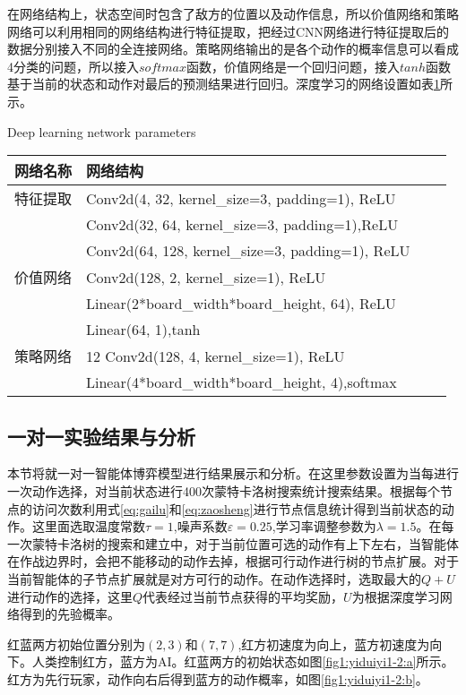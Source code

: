 在网络结构上，状态空间时包含了敌方的位置以及动作信息，所以价值网络和策略网络可以利用相同的网络结构进行特征提取，把经过CNN网络进行特征提取后的数据分别接入不同的全连接网络。策略网络输出的是各个动作的概率信息可以看成4分类的问题，所以接入$softmax$函数，价值网络是一个回归问题，接入$tanh$函数基于当前的状态和动作对最后的预测结果进行回归。深度学习的网络设置如表\ref{tab4}所示。

\begin{table}[htbp]
	\centering
	{ Deep learning network parameters }
	\label{tab4}
	\begin{tabular}{llll} \toprule
		网络名称   & 网络结构  \\  \midrule
		特征提取 &	Conv2d(4, 32, kernel\_size=3, padding=1), ReLU\\
		&	Conv2d(32, 64, kernel\_size=3, padding=1),ReLU\\
		&	Conv2d(64, 128, kernel\_size=3, padding=1), ReLU\\
		价值网络&Conv2d(128, 2, kernel\_size=1), ReLU\\
		&Linear(2*board\_width*board\_height, 64), ReLU\\
		&Linear(64, 1),tanh\\
		策略网络&12 Conv2d(128, 4, kernel\_size=1), ReLU\\
		&Linear(4*board\_width*board\_height,
		4),softmax\\
		
		\bottomrule
	\end{tabular}
\end{table}


\subsection{一对一实验结果与分析}
本节将就一对一智能体博弈模型进行结果展示和分析。在这里参数设置为当每进行一次动作选择，对当前状态进行400次蒙特卡洛树搜索统计搜索结果。根据每个节点的访问次数利用式\ref{eq:gailu}和\ref{eq:zaosheng}进行节点信息统计得到当前状态的动作。这里面选取温度常数$\tau=1$,噪声系数$\varepsilon=0.25$,学习率调整参数为$\lambda=1.5$。在每一次蒙特卡洛树的搜索和建立中，对于当前位置可选的动作有上下左右，当智能体在作战边界时，会把不能移动的动作去掉，根据可行动作进行树的节点扩展。对于当前智能体的子节点扩展就是对方可行的动作。在动作选择时，选取最大的$Q+U$进行动作的选择，这里$Q$代表经过当前节点获得的平均奖励，$U$为根据深度学习网络得到的先验概率。

红蓝两方初始位置分别为$(2,3)$和$(7,7)$,红方初速度为向上，蓝方初速度为向下。人类控制红方，蓝方为AI。红蓝两方的初始状态如图\ref{fig1:yiduiyi1-2:a}所示。红方为先行玩家，动作向右后得到蓝方的动作概率，如图\ref{fig1:yiduiyi1-2:b}。



